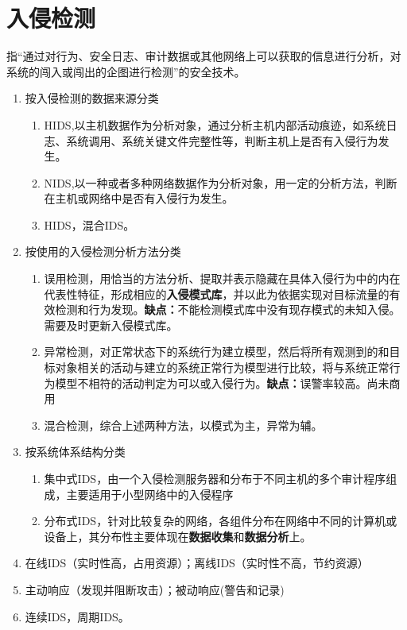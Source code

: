 \chapter{入侵检测}
指“通过对行为、安全日志、审计数据或其他网络上可以获取的信息进行分析，对系统的闯入或闯出的企图进行检测”的安全技术。

\begin{enumerate}
	\item 按入侵检测的数据来源分类
	\begin{enumerate}
		\item HIDS,以主机数据作为分析对象，通过分析主机内部活动痕迹，如系统日志、系统调用、系统关键文件完整性等，判断主机上是否有入侵行为发生。
		\item NIDS,以一种或者多种网络数据作为分析对象，用一定的分析方法，判断在主机或网络中是否有入侵行为发生。
		\item HIDS，混合IDS。
	\end{enumerate}
	\item 按使用的入侵检测分析方法分类
	\begin{enumerate}
		\item 误用检测，用恰当的方法分析、提取并表示隐藏在具体入侵行为中的内在代表性特征，形成相应的\textbf{入侵模式库}，并以此为依据实现对目标流量的有效检测和行为发现。\textbf{缺点：}不能检测模式库中没有现存模式的未知入侵。需要及时更新入侵模式库。
		\item 异常检测，对正常状态下的系统行为建立模型，然后将所有观测到的和目标对象相关的活动与建立的系统正常行为模型进行比较，将与系统正常行为模型不相符的活动判定为可以或入侵行为。\textbf{缺点：}误警率较高。尚未商用
		\item 混合检测，综合上述两种方法，以模式为主，异常为辅。 
	\end{enumerate}
	\item 按系统体系结构分类
	\begin{enumerate}
		\item 集中式IDS，由一个入侵检测服务器和分布于不同主机的多个审计程序组成，主要适用于小型网络中的入侵程序
		\item 
		分布式IDS，针对比较复杂的网络，各组件分布在网络中不同的计算机或设备上，其分布性主要体现在\textbf{数据收集}和\textbf{数据分析}上。
	\end{enumerate}
	\item 在线IDS（实时性高，占用资源）；离线IDS（实时性不高，节约资源）
	\item 主动响应（发现并阻断攻击）；被动响应(警告和记录)
	\item 连续IDS，周期IDS。
\end{enumerate}

